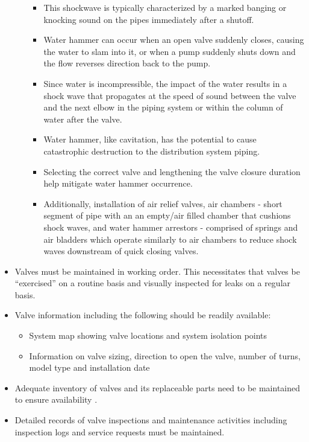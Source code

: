 \begin{itemize}
\begin{enumerate}
\begin{itemize}
\item This shockwave is typically characterized by a marked banging or knocking sound on the pipes immediately after a shutoff.
\item Water hammer can occur when an open valve suddenly closes, causing the water to slam into it, or when a pump suddenly shuts down and the flow reverses direction back to the pump. 
\item Since water is incompressible, the impact of the water results in a shock wave that propagates at the speed of sound between the valve and the next elbow in the piping system or within the column of water after the valve.
\item Water hammer, like cavitation, has the potential to cause catastrophic destruction to the distribution system piping.
\item Selecting the correct valve and lengthening the valve closure duration help mitigate water hammer occurrence.
\item Additionally, installation of air relief valves, air chambers - short segment of pipe with an an empty/air filled chamber that cushions shock waves, and water hammer arrestors - comprised of springs and air bladders which operate similarly to air chambers to reduce shock waves downstream of quick closing valves.
\end{itemize}
\end{enumerate}
\item Valves must be maintained in working order.  This necessitates that valves be “exercised” on a routine basis and visually inspected for leaks on a regular basis.
\item Valve information including the following should be readily available:
\begin{itemize}
\item System map showing valve locations and system isolation points
\item Information on valve sizing, direction to open the valve, number of turns, model type and installation date
\end{itemize}
\item Adequate inventory of valves and its replaceable parts need to be maintained to ensure availability .
\item Detailed records of valve inspections and maintenance activities including inspection logs and service requests must be maintained.
\end{itemize}

